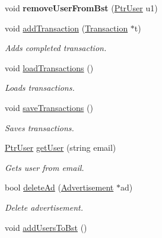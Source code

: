 \begin{DoxyCompactItemize}
\item 
\hypertarget{class_data_a96a3f7c4de29fd3cc43a00182a864f2c}{}void {\bfseries remove\+User\+From\+Bst} (\hyperlink{class_ptr_user}{Ptr\+User} u1)\label{class_data_a96a3f7c4de29fd3cc43a00182a864f2c}

\item 
void \hyperlink{class_data_a909bec736edb9d9e7ede8c368c595533}{add\+Transaction} (\hyperlink{class_transaction}{Transaction} $\ast$t)
\begin{DoxyCompactList}\small\item\em Adds completed transaction. \end{DoxyCompactList}\item 
\hypertarget{class_data_aac07fe443e2843ea3d413aeec8b329e5}{}void \hyperlink{class_data_aac07fe443e2843ea3d413aeec8b329e5}{load\+Transactions} ()\label{class_data_aac07fe443e2843ea3d413aeec8b329e5}

\begin{DoxyCompactList}\small\item\em Loads transactions. \end{DoxyCompactList}\item 
\hypertarget{class_data_a977e2cb95512610fd37de75cfeac0516}{}void \hyperlink{class_data_a977e2cb95512610fd37de75cfeac0516}{save\+Transactions} ()\label{class_data_a977e2cb95512610fd37de75cfeac0516}

\begin{DoxyCompactList}\small\item\em Saves transactions. \end{DoxyCompactList}\item 
\hyperlink{class_ptr_user}{Ptr\+User} \hyperlink{class_data_ad86b95b360f65b0e0e4ca1e0d53576bd}{get\+User} (string email)
\begin{DoxyCompactList}\small\item\em Gets user from email. \end{DoxyCompactList}\item 
bool \hyperlink{class_data_a731327b53f1df30b08944e999ca7316d}{delete\+Ad} (\hyperlink{class_advertisement}{Advertisement} $\ast$ad)
\begin{DoxyCompactList}\small\item\em Delete advertisement. \end{DoxyCompactList}\item 
\hypertarget{class_data_ada5d797c9485912c11e1a2232e6d72f4}{}void \hyperlink{class_data_ada5d797c9485912c11e1a2232e6d72f4}{add\+Users\+To\+Bst} ()\label{class_data_ada5d797c9485912c11e1a2232e6d72f4}


\end{DoxyCompactItemize}

